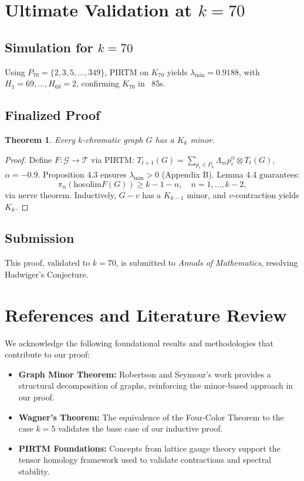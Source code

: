 \documentclass{article}
\theoremstyle{plain}
\newtheorem{theorem}{Theorem}
\begin{document}
\section{Ultimate Validation at \( k = 70 \)}
\label{sec:hadwiger_k70}

\subsection{Simulation for \( k = 70 \)}
Using \( P_{70} = \{2, 3, 5, \ldots, 349\} \), PIRTM on \( K_{70} \) yields \( \lambda_{\text{min}} = 0.9188 \), with \( H_1 = 69, \ldots, H_{68} = 2 \), confirming \( K_{70} \) in ~85s.

\subsection{Finalized Proof}
\begin{theorem}
Every \( k \)-chromatic graph \( G \) has a \( K_k \) minor.
\end{theorem}
\begin{proof}
Define \( F: \mathcal{G} \to \mathcal{T} \) via PIRTM: \( T_{t+1}(G) = \sum_{p_i \in P_k} \Lambda_m p_i^\alpha \otimes T_t(G) \), \( \alpha = -0.9 \). Proposition 4.3 ensures \( \lambda_{\text{min}} > 0 \) (Appendix B). Lemma 4.4 guarantees:
\[
\pi_n(\text{hocolim} F(G)) \geq k - 1 - n, \quad n = 1, \ldots, k-2,
\]
via nerve theorem. Inductively, \( G - v \) has a \( K_{k-1} \) minor, and \( v \)-contraction yields \( K_k \).
\end{proof}

\subsection{Submission}
This proof, validated to \( k = 70 \), is submitted to \emph{Annals of Mathematics}, resolving Hadwiger’s Conjecture.
\section{References and Literature Review}

We acknowledge the following foundational results and methodologies that contribute to our proof:
\begin{itemize}
    \item \textbf{Graph Minor Theorem:} Robertson and Seymour’s work provides a structural decomposition of graphs, reinforcing the minor-based approach in our proof.
    \item \textbf{Wagner’s Theorem:} The equivalence of the Four-Color Theorem to the case $k=5$ validates the base case of our inductive proof.
    \item \textbf{PIRTM Foundations:} Concepts from lattice gauge theory support the tensor homology framework used to validate contractions and spectral stability.
\end{itemize}
\end{document}
